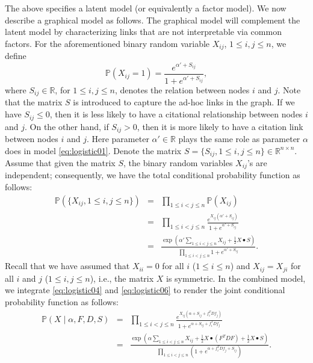 \documentclass[AMS,STIX1COL]{WileyNJD-v2}
\begin{document}
{The above specifies a latent model (or equivalently a factor model).
We now describe a graphical model as follows.
The graphical model will complement the latent model by characterizing links that are not interpretable via common factors.
For the aforementioned binary random variable $X_{ij}$, $1\le i,j \le n$, we define
\begin{equation}
\label{eq:logistic05}
\mathbb{P}(X_{ij}=1) = \frac{e^{\alpha' + S_{ij} }}{1 + e^{\alpha' + S_{ij} }},
\end{equation}
where $S_{ij} \in \mathbb{R}$, for $1\le i,j \le n$, denotes the relation between nodes $i$ and $j$.
Note that the matrix $S$ is introduced to capture the ad-hoc links in the graph.
If we have $S_{ij}\leq0$, then it is less likely to have a citational relationship between nodes $i$ and $j$.
On the other hand, if $S_{ij}>0$, then it is more likely to have a citation link between nodes $i$ and $j$.
Here parameter $\alpha' \in \mathbb{R}$ plays the same role as parameter $\alpha$ does in model \eqref{eq:logistic01}.
Denote the matrix $S = \{S_{ij}, 1\le i,j \le n \} \in \mathbb{R}^{n \times n}$.
Assume that given the matrix $S$, the binary random variables
$X_{ij}$'s are independent;
consequently, we have the total conditional probability function as follows:
\begin{eqnarray}
\mathbb{P}(\{X_{ij}, 1\le i,j \le n\})
&=& \prod_{1\le i<j \le n} \mathbb{P}(X_{ij}) \nonumber \\
&=& \prod_{1\le i<j \le n}  \frac{e^{X_{ij}(\alpha' + S_{ij}) }}{1 + e^{\alpha' + S_{ij} }} \nonumber \\
&=& \frac{\exp\left(\alpha' \sum_{1\le i< j\le n}X_{ij} +\frac{1}{2} X \bullet S\right)}{\prod_{1\le i<j \le n}  1 + e^{\alpha' + S_{ij} }}.
\label{eq:logistic06}
\end{eqnarray}
Recall that we have assumed that $X_{ii}=0$ for all $i$ ($1\le i \le n$) and $X_{ij} = X_{ji}$ for all $i$ and $j$ ($1\le i,j \le n$), i.e., the matrix $X$ is symmetric.
In the combined model, we integrate \eqref{eq:logistic04} and
\eqref{eq:logistic06} to render the joint conditional probability function as follows:
\begin{eqnarray}
\label{eq:logistic07}
\mathbb{P}(X \mid \alpha,  F, D, S)
&=&  \prod_{1\le i<j \le n}
\frac{e^{X_{ij}(\alpha + S_{ij} + f_i^T D f_j) }}{1 + e^{\alpha + S_{ij}+ f_i^T D f_j}} \nonumber \\
&=& \frac{\exp\left(\alpha \sum_{1\le i< j\le n}X_{ij} +\frac{1}{2} X \bullet (F^T D F) +\frac{1}{2} X \bullet S\right)}{\prod_{1\le i<j \le n}  \left(1 + e^{\alpha + f_i^T D f_j +S_{ij}}\right) }.
\end{eqnarray}


}
\end{document}
